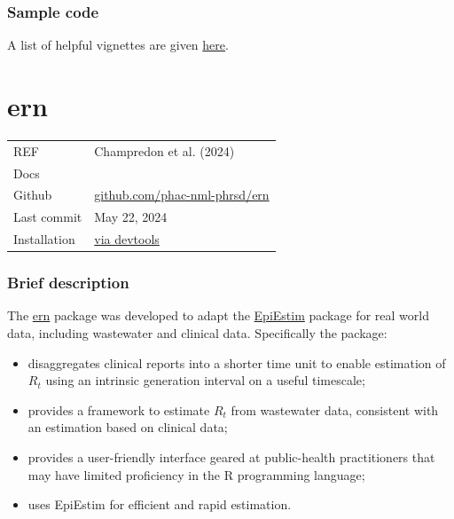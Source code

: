 \documentclass[
  letterpaper,
  DIV=11,
  numbers=noendperiod]{scrreprt}
\providecommand{\tightlist}{%
  \setlength{\itemsep}{0pt}\setlength{\parskip}{0pt}}\usepackage{longtable,booktabs,array}
\begin{document}
\subsection*{Sample code}\label{sample-code-7}

A list of helpful vignettes are given
\href{https://package.epinowcast.org/articles/}{here}.

\chapter*{ern}\label{ern}


\begin{longtable}[]{@{}
  >{\raggedright\arraybackslash}p{}
  >{\raggedright\arraybackslash}p{}@{}}
\toprule\noalign{}
\endhead
\bottomrule\noalign{}
\endlastfoot
REF & Champredon et al. (2024) \\
Docs & \\
Github &
\href{https://github.com/phac-nml-phrsd/ern}{github.com/phac-nml-phrsd/ern} \\
Last commit & May 22, 2024 \\
Installation & \href{https://github.com/phac-nml-phrsd/ern}{via
devtools} \\
\end{longtable}

\subsection*{Brief description}\label{brief-description-10}

The \href{package_ern.qmd}{ern} package was developed to adapt the
\href{package_EpiEstim.qmd}{EpiEstim} package for real world data,
including wastewater and clinical data. Specifically the package:

\begin{itemize}
\tightlist
\item
  disaggregates clinical reports into a shorter time unit to enable
  estimation of \(R_t\) using an intrinsic generation interval on a
  useful timescale;
\item
  provides a framework to estimate \(R_t\) from wastewater data,
  consistent with an estimation based on clinical data;
\item
  provides a user-friendly interface geared at public-health
  practitioners that may have limited proficiency in the R programming
  language;
\item
  uses EpiEstim for efficient and rapid estimation.
\end{itemize}
\end{document}
